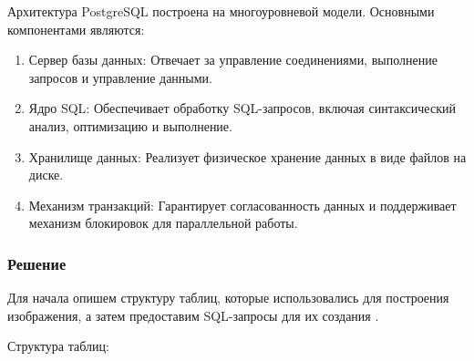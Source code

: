 \documentclass[pract]{SCWorks}
\begin{document}
Архитектура PostgreSQL построена на многоуровневой модели. Основными 
компонентами являются:
\begin{enumerate}
    \item Сервер базы данных: Отвечает за управление соединениями, выполнение 
    запросов и управление данными.
    \item Ядро SQL: Обеспечивает обработку SQL-запросов, включая 
    синтаксический анализ, оптимизацию и выполнение.
    \item Хранилище данных: Реализует физическое хранение данных в виде 
    файлов на диске.
    \item Механизм транзакций: Гарантирует согласованность данных и 
    поддерживает механизм блокировок для параллельной работы.
\end{enumerate}

\subsubsection{Решение}

Для начала опишем структуру таблиц, которые использовались для построения
изображения, а затем предоставим SQL-запросы для их создания \cite{postgresql}.

Структура таблиц:
\end{document}
